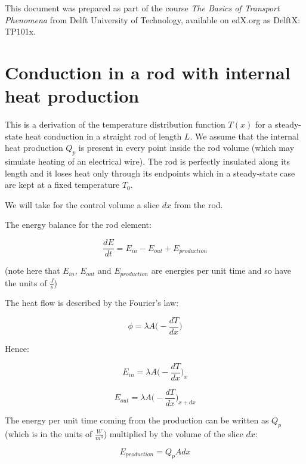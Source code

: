 \documentclass[10pt]{article}
\begin{document}
\setlength{\parskip}{0.6em}
\setlength{\parindent}{0cm}

This document was prepared as part of the course \textit{The Basics of Transport Phenomena} from Delft University of Technology, available on edX.org as DelftX: TP101x.

\section*{Conduction in a rod with internal heat production}

This is a derivation of the temperature distribution function $T(x)$ for a steady-state heat conduction in a straight rod of length $L$. We assume that the internal heat production $Q_p$ is present in every point inside the rod volume (which may simulate heating of an electrical wire). The rod is perfectly insulated along its length and it loses heat only through its endpoints which in a steady-state case are kept at a fixed temperature $T_0$.

We will take for the control volume a slice $dx$ from the rod. 

The energy balance for the rod element:

\begin{equation}
\frac{dE}{dt} = E_{in} - E_{out} + E_{production}
\end{equation}

(note here that $E_{in}$, $E_{out}$ and $E_{production}$ are energies per unit time and so have the units of $\frac{J}{s}$)

The heat flow is described by the Fourier's law:

\begin{equation}
\phi = \lambda A \Big(- \frac{dT}{dx} \Big)
\label{eq:fourier}
\end{equation}

Hence:

\begin{equation}
E_{in} = \lambda A \Big(- \frac{dT}{dx} \Big)_x
\end{equation}

\begin{equation}
E_{out} = \lambda A \Big(- \frac{dT}{dx} \Big)_{x + dx}
\end{equation}


The energy per unit time coming from the production can be written as $Q_p$ (which is in the units of $\frac{W}{m^3}$) multiplied by the volume of the slice $dx$:

\begin{equation}
E_{production} = Q_p A dx
\end{equation}
\end{document}
